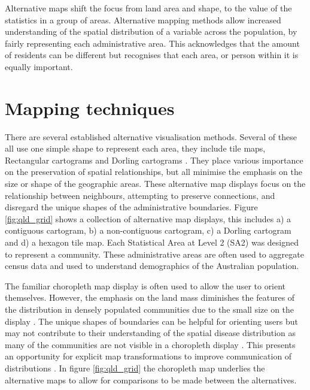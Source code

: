 \documentclass{monashthesis}
\begin{document}
Alternative maps shift the focus from land area and shape, to the value of the statistics in a group of areas.
Alternative mapping methods allow increased understanding of the spatial distribution of a variable across the population, by fairly representing each administrative area. This acknowledges that the amount of residents can be different but recognises that each area, or person within it is equally important.

\hypertarget{mapping-techniques}{%
\section{Mapping techniques}\label{mapping-techniques}}

There are several established alternative visualisation methods.
Several of these all use one simple shape to represent each area, they include tile maps, Rectangular cartograms \autocite{ORC} and Dorling cartograms \autocite{ACTUC}. They place various importance on the preservation of spatial relationships, but all minimise the emphasis on the size or shape of the geographic areas. These alternative map displays focus on the relationship between neighbours, attempting to preserve connections, and disregard the unique shapes of the administrative boundaries. Figure \ref{fig:qld_grid} shows a collection of alternative map displays, this includes a) a contiguous cartogram, b) a non-contiguous cartogram, c) a Dorling cartogram and d) a hexagon tile map.
Each Statistical Area at Level 2 (SA2) was designed to represent a community. These administrative areas are often used to aggregate census data and used to understand demographics of the Australian population.

The familiar choropleth map display is often used to allow the user to orient themselves. However, the emphasis on the land mass diminishes the features of the distribution in densely populated communities due to the small size on the display \autocite{ACTUC}.
The unique shapes of boundaries can be helpful for orienting users but may not contribute to their understanding of the spatial disease distribution as many of the communities are not visible in a choropleth display \autocite{TVSSS}. This presents an opportunity for explicit map transformations to improve communication of distributions \autocite{CBATCC}. In figure \ref{fig:qld_grid} the choropleth map underlies the alternative maps to allow for comparisons to be made between the alternatives.
\end{document}
